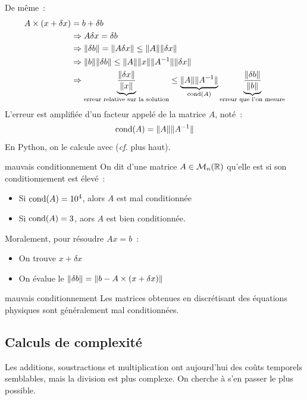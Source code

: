 De même~:
\begin{align*}
    A \times (x + \delta x) &= b + \delta b \\
    &\Rightarrow A \delta x = \delta b\\
    &\Rightarrow \lVert\delta b\rVert = \lVert A \delta x\rVert \leq \lVert A\rVert\lVert\delta x\rVert\\
    &\Rightarrow \lVert b\rVert \lVert\delta b\rVert \leq \lVert A\rVert\lVert x\rVert \lVert A^{-1}\rVert\lVert\delta x\rVert\\
    &\Rightarrow \underbrace{\frac{\lVert\delta x\rVert}{\lVert x\rVert}}_{\text{erreur relative sur la solution}} \leq \underbrace{\lVert A\rVert\lVert A^{-1}\rVert}_{\mathrm{cond}(A)} \underbrace{\frac{\lVert\delta b\rVert}{\lVert b\rVert}}_{\text{erreur que l'on mesure}}\\
\end{align*}
L'erreur est amplifiée d'un facteur appelé  de la matrice $A$, noté~:
$$\mathrm{cond}(A) = \lVert A\rVert\lVert A^{-1}\rVert$$
En Python, on le calcule avec  (\textit{cf.} plus haut).

\begin{definition}{}{mauvais conditionnement}
    On dit d'une matrice $A \in \mathcal{M}_{n}(\mathbb{R})$ qu'elle est  si son conditionnement est élevé~:
    \begin{itemize}
        \item Si $\mathrm{cond}(A) = 10^4$, alors $A$ est mal conditionnée
        \item Si $\mathrm{cond}(A) = 3$, aors $A$ est bien conditionnée.
    \end{itemize}
\end{definition}

Moralement, pour résoudre $Ax = b$~:
\begin{itemize}
    \item On trouve $x + \delta x$
    \item On évalue le  $\lVert\delta b\rVert = \lVert b - A\times(x + \delta x)\rVert$
\end{itemize}

\begin{remarque}{}{mauvais conditionnement}
    Les matrices obtenues en discrétisant des équations physiques sont généralement mal conditionnées.
\end{remarque}



\subsection{Calculs de complexité}
Les additions, soustractions et multiplication ont aujourd'hui des coûts temporels semblables, mais la division est plus complexe. On cherche à s'en passer le plus possible.

